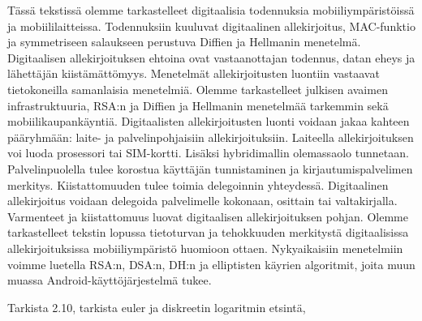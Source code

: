 \documentclass[finnish]{tktltiki2}
\theoremstyle{definition}
\theoremstyle{remark}
\begin{document}
Tässä tekstissä olemme tarkastelleet digitaalisia todennuksia mobiiliympäristöissä ja mobiililaitteissa. Todennuksiin kuuluvat digitaalinen allekirjoitus, MAC-funktio ja symmetriseen salaukseen perustuva Diffien ja Hellmanin menetelmä. Digitaalisen allekirjoituksen ehtoina ovat vastaanottajan todennus, datan eheys ja lähettäjän kiistämättömyys. Menetelmät allekirjoitusten luontiin vastaavat tietokoneilla samanlaisia menetelmiä. Olemme tarkastelleet julkisen avaimen infrastruktuuria, RSA:n ja Diffien ja Hellmanin menetelmää tarkemmin sekä mobiilikaupankäyntiä. Digitaalisten allekirjoitusten luonti voidaan jakaa kahteen pääryhmään: laite- ja palvelinpohjaisiin allekirjoituksiin. Laiteella allekirjoituksen voi luoda prosessori tai SIM-kortti. Lisäksi hybridimallin olemassaolo tunnetaan. Palvelinpuolella tulee korostua käyttäjän tunnistaminen ja kirjautumispalvelimen merkitys. Kiistattomuuden tulee toimia delegoinnin yhteydessä. Digitaalinen allekirjoitus voidaan delegoida palvelimelle kokonaan, osittain tai valtakirjalla. Varmenteet ja kiistattomuus luovat digitaalisen allekirjoituksen pohjan. Olemme tarkastelleet tekstin lopussa tietoturvan ja tehokkuuden merkitystä digitaalisissa allekirjoituksissa mobiiliympäristö huomioon ottaen. Nykyaikaisiin menetelmiin voimme luetella RSA:n, DSA:n, DH:n ja elliptisten käyrien algoritmit, joita muun muassa Android-käyttöjärjestelmä tukee.

Tarkista 2.10, tarkista euler ja diskreetin logaritmin etsintä, 


%
%
%

\newpage






 
\end{document}
